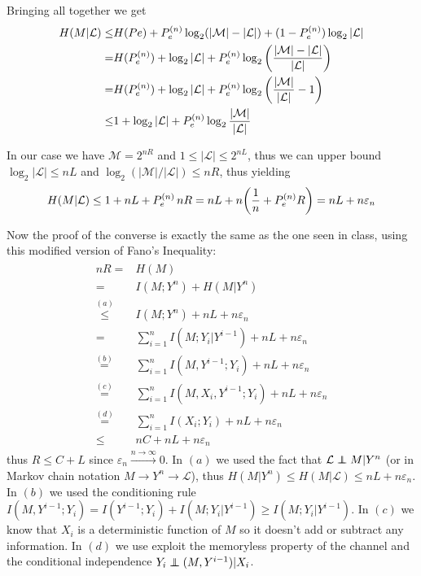 Bringing all together we get
%
\begin{align}
\begin{split}
H(M|\mathcal{L}) \leq & H(Pe) + P_e^{(n)}\log_2(|\mathcal{M}|-|\mathcal{L}|) + (1-P_e^{(n)})\log_2|\mathcal{L}|\\
=& H(P_e^{(n)}) + \log_2|\mathcal{L}| + P_e^{(n)}\log_2\qty(\frac{|\mathcal{M}|-|\mathcal{L}|}{|\mathcal{L}|})\\
=& H(P_e^{(n)}) + \log_2|\mathcal{L}| + P_e^{(n)}\log_2\qty(\frac{|\mathcal{M}|}{|\mathcal{L}|} - 1)\\
\leq& 1 + \log_2|\mathcal{L}| + P_e^{(n)}\log_2\frac{|\mathcal{M}|}{|\mathcal{L}|}
\end{split}
\end{align}

In our case we have $\mathcal{M}=2^{nR}$ and $1\leq |\mathcal{L}| \leq 2^{nL}$, thus we can upper bound $\log_2|\mathcal{L}| \leq nL$ and $\log_2(|\mathcal{M}|/|\mathcal{L}|) \leq nR$, thus yielding
%
\begin{equation}
H(M|\mathcal{L}) \leq 1+nL+P_e^{(n)} \, nR = nL + n\qty(\frac{1}{n} + P_e^{(n)} R) = nL + n\varepsilon_n
\end{equation}

Now the proof of the converse is exactly the same as the one seen in class, using this modified version of Fano's Inequality:
%
\begin{align}
\begin{split}
nR =& H(M)\\
=&  I(M;Y^n) + H(M|Y^n)\\
\stackrel{(a)}{\leq}& I(M;Y^n) + nL + n\varepsilon_n\\
=& \sum_{i=1}^n I(M;Y_i|Y^{i-1}) + nL+n\varepsilon_n\\
\stackrel{(b)}{=}& \sum_{i=1}^n I(M,Y^{i-1};Y_i) + nL+n\varepsilon_n\\
\stackrel{(c)}{=}& \sum_{i=1}^n I(M,X_i,Y^{i-1};Y_i) + nL+n\varepsilon_n\\
\stackrel{(d)}{=}& \sum_{i=1}^n I(X_i;Y_i) + nL+n\varepsilon_n\\
\leq& nC + nL+n\varepsilon_n
\end{split}
\end{align}
%
thus $R\leq C+L$ since $\varepsilon_n \xrightarrow{n\rightarrow\infty} 0$. In $(a)$ we used the fact that $\mathcal{L} \independent M |Y^n$ (or in Markov chain notation $M\rightarrow Y^n\rightarrow \mathcal{L}$), thus $H(M|Y^n)\leq H(M|\mathcal{L}) \leq nL + n\varepsilon_n$. In $(b)$ we used the conditioning rule $I(M,Y^{i-1};Y_i) = I(Y^{i-1};Y_i) + I(M;Y_i|Y^{i-1}) \geq I(M;Y_i|Y^{i-1})$. In $(c)$ we know that $X_i$ is a deterministic function of $M$ so it doesn't add or subtract any information. In $(d)$ we use exploit the memoryless property of the channel and the conditional independence $Y_i \independent (M,Y^{i-1})|X_i$.

